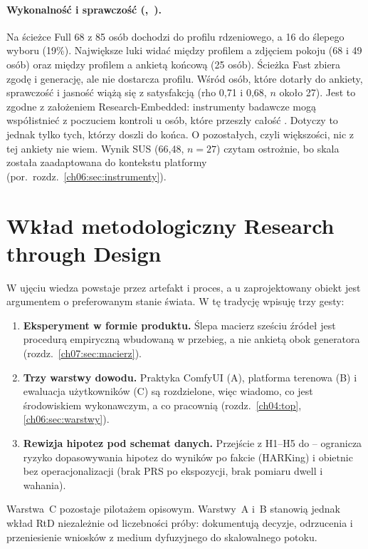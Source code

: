 \paragraph{Wykonalność i sprawczość (,~).}
Na ścieżce Full 68 z 85 osób dochodzi do profilu rdzeniowego, a 16 do ślepego wyboru (19\%). Największe luki widać między profilem a zdjęciem pokoju (68 i 49 osób) oraz między profilem a ankietą końcową (25 osób). Ścieżka Fast zbiera zgodę i generację, ale nie dostarcza profilu.
Wśród osób, które dotarły do ankiety, sprawczość i jasność wiążą się z satysfakcją (rho 0,71 i 0,68, $n$ około 27). Jest to zgodne z założeniem Research-Embedded: instrumenty badawcze mogą współistnieć z poczuciem kontroli u osób, które przeszły całość \parencite{zimmerman2007rtd,idaPlatform2026}. Dotyczy to jednak tylko tych, którzy doszli do końca. O pozostałych, czyli większości, nic z tej ankiety nie wiem.
Wynik SUS (66,48, $n=27$) czytam ostrożnie, bo skala została zaadaptowana do kontekstu platformy (por.\ rozdz.~\ref{ch06:sec:instrumenty}).

\section{Wkład metodologiczny Research through Design}
\label{ch09:sec:rtd}

W ujęciu \textcite{frayling1993research} wiedza powstaje przez artefakt i proces, a u \textcite{zimmerman2007rtd} zaprojektowany obiekt jest argumentem o preferowanym stanie świata.
W tę tradycję wpisuję trzy gesty:

\begin{enumerate}
  \item \textbf{Eksperyment w formie produktu.} Ślepa macierz sześciu źródeł jest procedurą empiryczną wbudowaną w przebieg, a nie ankietą obok generatora (rozdz.~\ref{ch07:sec:macierz}).
  \item \textbf{Trzy warstwy dowodu.} Praktyka ComfyUI (A), platforma terenowa (B) i ewaluacja użytkowników (C) są rozdzielone, więc wiadomo, co jest środowiskiem wykonawczym, a co pracownią (rozdz.~\ref{ch04:top}, \ref{ch06:sec:warstwy}).
  \item \textbf{Rewizja hipotez pod schemat danych.} Przejście z H1--H5 do -- ogranicza ryzyko dopasowywania hipotez do wyników po fakcie (HARKing) i obietnic bez operacjonalizacji (brak PRS po ekspozycji, brak pomiaru dwell i wahania).
\end{enumerate}

Warstwa~C pozostaje pilotażem opisowym. Warstwy~A i~B stanowią jednak wkład RtD niezależnie od liczebności próby: dokumentują decyzje, odrzucenia i przeniesienie wniosków z medium dyfuzyjnego do skalowalnego potoku.

